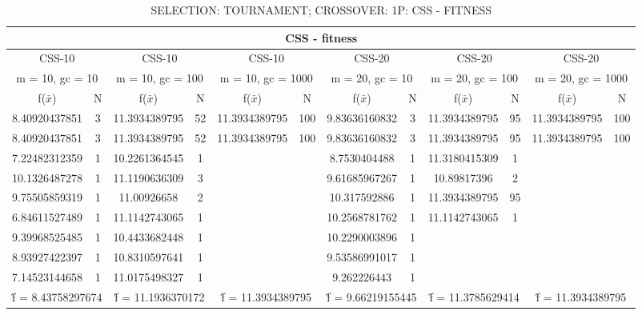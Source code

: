 \begin{table}[H]
	\centering
	\caption{SELECTION: TOURNAMENT; CROSSOVER: 1P: CSS - FITNESS}
	\begin{adjustbox}{width=1\textwidth}
		\begin{tabular}{ |c|c||c|c||c|c||c|c||c|c||c|c| }
			\hline
			\multicolumn{12}{|c|}{CSS - fitness} \\
			\hline
			\multicolumn{2}{|c||}{CSS-10} & \multicolumn{2}{c||}{CSS-10} & \multicolumn{2}{c||}{CSS-10} & \multicolumn{2}{c||}{CSS-20} & \multicolumn{2}{c||}{CSS-20} & \multicolumn{2}{c|}{CSS-20}\\
			\hline
			\multicolumn{2}{|c||}{m = 10, gc = 10} & \multicolumn{2}{c||}{m = 10, gc = 100} & \multicolumn{2}{c||}{m = 10, gc = 1000} & \multicolumn{2}{c||}{m = 20, gc = 10} & \multicolumn{2}{c||}{m = 20, gc = 100} & \multicolumn{2}{c|}{m = 20, gc = 1000}\\
			\hline
			f($\bar{x}$) & N & f($\bar{x}$) & N & f($\bar{x}$) & N & f($\bar{x}$) & N & f($\bar{x}$) & N & f($\bar{x}$) & N\\
			\hline
			\hline
			8.40920437851 & 3 & 11.3934389795 & 52 & 11.3934389795 & 100 & 9.83636160832 & 3 & 11.3934389795 & 95 & 11.3934389795 & 100\\
			\hline
			8.40920437851 & 3 & 11.3934389795 & 52 & 11.3934389795 & 100 & 9.83636160832 & 3 & 11.3934389795 & 95 & 11.3934389795 & 100\\
			7.22482312359 & 1 & 10.2261364545 & 1 &   &   & 8.7530404488 & 1 & 11.3180415309 & 1 &   &  \\
			10.1326487278 & 1 & 11.1190636309 & 3 &   &   & 9.61685967267 & 1 & 10.89817396 & 2 &   &  \\
			9.75505859319 & 1 & 11.00926658 & 2 &   &   & 10.317592886 & 1 & 11.3934389795 & 95 &   &  \\
			6.84611527489 & 1 & 11.1142743065 & 1 &   &   & 10.2568781762 & 1 & 11.1142743065 & 1 &   &  \\
			9.39968525485 & 1 & 10.4433682448 & 1 &   &   & 10.2290003896 & 1 &   &   &   &  \\
			8.93927422397 & 1 & 10.8310597641 & 1 &   &   & 9.53586991017 & 1 &   &   &   &  \\
			7.14523144658 & 1 & 11.0175498327 & 1 &   &   & 9.262226443 & 1 &   &   &   &  \\
			\hline
			\multicolumn{2}{|c||}{\^{f} = 8.43758297674} & \multicolumn{2}{c||}{\^{f} = 11.1936370172} & \multicolumn{2}{c||}{\^{f} = 11.3934389795} & \multicolumn{2}{c||}{\^{f} = 9.66219155445} & \multicolumn{2}{c||}{\^{f} = 11.3785629414} & \multicolumn{2}{c|}{\^{f} = 11.3934389795}\\
			\hline
		\end{tabular}
	\end{adjustbox}
\end{table}
